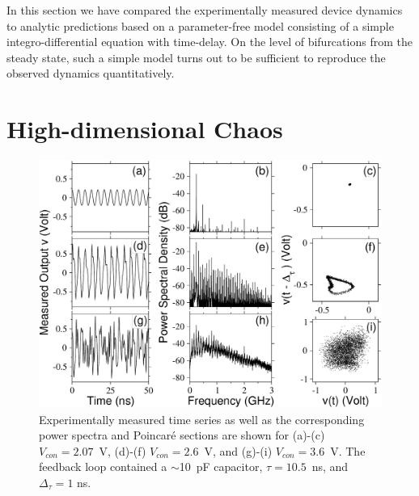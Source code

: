 \documentclass[aps,twocolumn,pre,nofootinbib]{revtex4}
\begin{document}
In this section we have compared the experimentally measured device dynamics to analytic predictions based on a parameter-free model consisting of a simple integro-differential equation with time-delay.
On the level of bifurcations from the steady state, such a simple model turns out to be sufficient to reproduce the observed dynamics quantitatively.






\section{High-dimensional Chaos \label{sec:chaos}}



%
%
% 
\begin{figure}
\includegraphics*[width=\breite \columnwidth]{Fig5} 
\caption{Experimentally measured time series as well as the corresponding power spectra and Poincar\'{e} sections are shown for (a)-(c) $V_{con}=2.07$~V, (d)-(f) $V_{con}=2.6$~V, and (g)-(i) $V_{con}=3.6$~V. The feedback loop contained a $\sim$10~pF capacitor, $\tau=10.5$~ns, and  $\Delta_{\tau} = 1$ ns.}
\label{fig:r2c_exp}
\end{figure}
\end{document}
